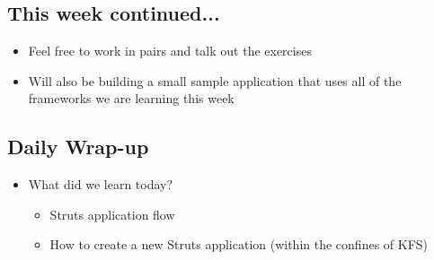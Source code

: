 \documentclass[12pt,notitlepage]{article}
\begin{document}
    \W \begin{s5slide}
        \W \section{This week continued...}
        \begin{ifhtml}
            \begin{itemize}
                \item Feel free to work in pairs and talk out the exercises
                \item Will also be building a small sample application that uses all of the frameworks we are learning this week
            \end{itemize}
        \end{ifhtml} 
    \W \end{s5slide}






    \W \begin{s5slide}
        \W \section{Daily Wrap-up}
        \begin{ifhtml}
            \begin{itemize}
                \item What did we learn today?
                \begin{itemize}
                    \item Struts application flow
                    \item How to create a new Struts application (within the confines of KFS)
                \end{itemize}
            \end{itemize}
        \end{ifhtml} 
    \W \end{s5slide}
\end{document}
